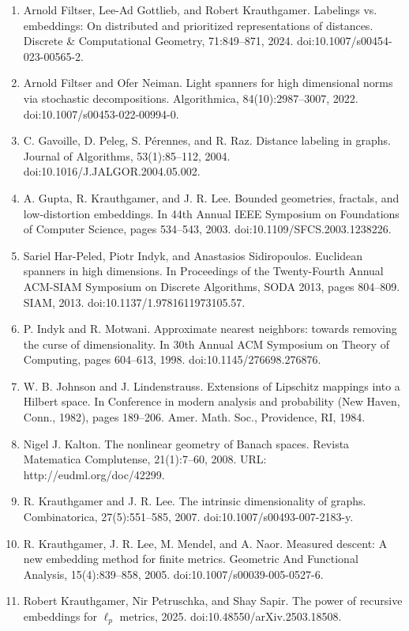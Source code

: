 \documentclass[10pt,a4paper]{amsart}
\begin{document}
\begin{enumerate}
\item  [21]  Arnold Filtser, Lee-Ad Gottlieb, and Robert Krauthgamer.  Labelings vs. embeddings: On distributed and prioritized representations of distances.  Discrete \& Computational Geometry, 71:849–871, 2024.  doi:10.1007/s00454-023-00565-2.  
\item  [22]  Arnold Filtser and Ofer Neiman.  Light spanners for high dimensional norms via stochastic decompositions.  Algorithmica, 84(10):2987–3007, 2022.  doi:10.1007/s00453-022-00994-0.  
\item  [23]  C. Gavoille, D. Peleg, S. Pérennes, and R. Raz.  Distance labeling in graphs.  Journal of Algorithms, 53(1):85–112, 2004.  doi:10.1016/J.JALGOR.2004.05.002.  
\item  [24]  A. Gupta, R. Krauthgamer, and J. R. Lee.  Bounded geometries, fractals, and low-distortion embeddings.  In 44th Annual IEEE Symposium on Foundations of Computer Science, pages 534–543, 2003.  doi:10.1109/SFCS.2003.1238226.  
\item  [25]  Sariel Har-Peled, Piotr Indyk, and Anastasios Sidiropoulos.  Euclidean spanners in high dimensions.  In Proceedings of the Twenty-Fourth Annual ACM-SIAM Symposium on Discrete Algorithms, SODA 2013, pages 804–809. SIAM, 2013.  doi:10.1137/1.9781611973105.57.  
\item  [26]  P. Indyk and R. Motwani.  Approximate nearest neighbors: towards removing the curse of dimensionality.  In 30th Annual ACM Symposium on Theory of Computing, pages 604–613, 1998.  doi:10.1145/276698.276876.  
\item  [27]  W. B. Johnson and J. Lindenstrauss.  Extensions of Lipschitz mappings into a Hilbert space.  In Conference in modern analysis and probability (New Haven, Conn., 1982), pages 189–206. Amer. Math. Soc., Providence, RI, 1984.  
\item  [28]  Nigel J. Kalton.  The nonlinear geometry of Banach spaces.  Revista Matematica Complutense, 21(1):7–60, 2008.  URL: http://eudml.org/doc/42299.  
\item  [29]  R. Krauthgamer and J. R. Lee.  The intrinsic dimensionality of graphs.  Combinatorica, 27(5):551–585, 2007.  doi:10.1007/s00493-007-2183-y.  
\item  [30]  R. Krauthgamer, J. R. Lee, M. Mendel, and A. Naor.  Measured descent: A new embedding method for finite metrics.  Geometric And Functional Analysis, 15(4):839–858, 2005.  doi:10.1007/s00039-005-0527-6.  
\item  [31]  Robert Krauthgamer, Nir Petruschka, and Shay Sapir.  The power of recursive embeddings for $\ell_{p}$ metrics, 2025.  doi:10.48550/arXiv.2503.18508.  

\end{enumerate}
\end{document}
